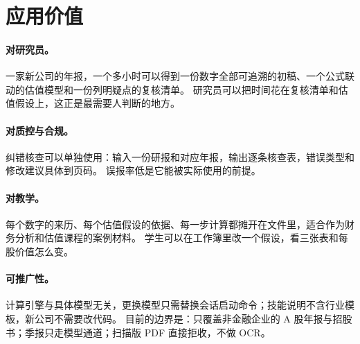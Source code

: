 \section{应用价值}

\paragraph{对研究员。}一家新公司的年报，一个多小时可以得到一份数字全部可追溯的初稿、一个公式联动的估值模型和一份列明疑点的复核清单。
研究员可以把时间花在复核清单和估值假设上，这正是最需要人判断的地方。

\paragraph{对质控与合规。}纠错核查可以单独使用：输入一份研报和对应年报，输出逐条核查表，错误类型和修改建议具体到页码。
误报率低是它能被实际使用的前提。

\paragraph{对教学。}每个数字的来历、每个估值假设的依据、每一步计算都摊开在文件里，适合作为财务分析和估值课程的案例材料。
学生可以在工作簿里改一个假设，看三张表和每股价值怎么变。

\paragraph{可推广性。}计算引擎与具体模型无关，更换模型只需替换会话启动命令；技能说明不含行业模板，新公司不需要改代码。
目前的边界是：只覆盖非金融企业的 A 股年报与招股书；季报只走模型通道；扫描版 PDF 直接拒收，不做 OCR。
